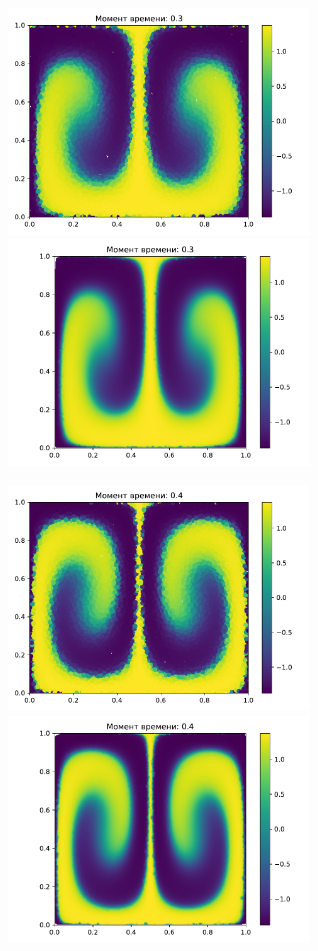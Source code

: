     \begin{figure}[H]
        \centering
        \includegraphics[width=8cm]{pictures/s15.pdf}
        \includegraphics[width=8cm]{pictures/p15.pdf}
    \end{figure}
    \begin{figure}[H]
        \centering
        \includegraphics[width=8cm]{pictures/s20.pdf}
        \includegraphics[width=8cm]{pictures/p20.pdf}
    \end{figure}


